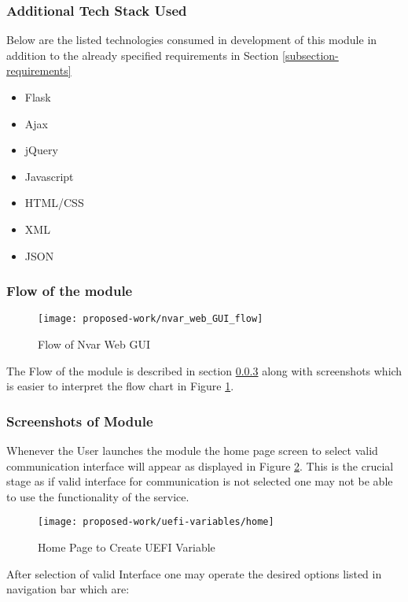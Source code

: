 \subsubsection{Additional Tech Stack Used}
Below are the listed technologies consumed in development of this module in addition to the already specified requirements in Section \ref{subsection-requirements}
\begin{itemize}
	\item Flask
	\item Ajax
	\item jQuery
	\item Javascript
	\item HTML/CSS
	\item XML
	\item JSON
\end{itemize}

\subsubsection{Flow of the module}
\begin{figure}[!htbp]
	\centering
	\texttt{[image: proposed-work/nvar\_web\_GUI\_flow]}
	\caption{Flow of Nvar Web GUI}\label{fig:nvar_web_GUI_flow}
\end{figure}
The Flow of the module is described in section \ref{subsubsection-screenshots} along with screenshots which is easier to interpret the flow chart in Figure \ref{fig:nvar_web_GUI_flow}.

\subsubsection{Screenshots of Module}\label{subsubsection-screenshots}
Whenever the User launches the module the home page screen to select valid communication interface will appear as displayed in Figure \ref{fig:uefi-variable-home}. This is the crucial stage as if valid interface for communication is not selected one may not be able to use the functionality of the service.

\begin{figure}[!htbp]
	\centering
	\texttt{[image: proposed-work/uefi-variables/home]}
	\caption{Home Page to Create UEFI Variable}\label{fig:uefi-variable-home}
\end{figure}

After selection of valid Interface one may operate the desired options listed in navigation bar which are:

